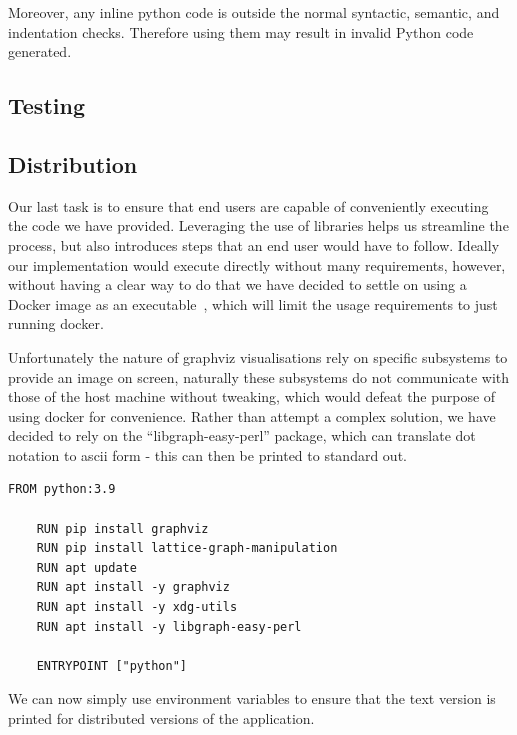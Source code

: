Moreover, any inline python code is outside the normal syntactic, semantic, and indentation checks.
Therefore using them may result in invalid Python code generated. 
\subsection{Testing}

\subsection{Distribution}
Our last task is to ensure that end users are capable of conveniently executing the code we have provided.
Leveraging the use of libraries helps us streamline the process, but also introduces steps that an end user would have
to follow.
Ideally our implementation would execute directly without many requirements, however, without having a clear way to do
that we have decided to settle on using a Docker image as an executable~\cite{DockerExec}, which will limit the usage
requirements to just running docker.

Unfortunately the nature of graphviz visualisations rely on specific subsystems to provide an image on screen, naturally
these subsystems do not communicate with those of the host machine without tweaking, which would defeat the purpose of
using docker for convenience.
Rather than attempt a complex solution, we have decided to rely on the ``libgraph-easy-perl'' package, which can
translate dot notation to ascii form - this can then be printed to standard out.

\begin{lstlisting}[caption={The DockerFile used for distribution},captionpos=b,label={lst:dockerfile}]
    FROM python:3.9

    RUN pip install graphviz
    RUN pip install lattice-graph-manipulation
    RUN apt update
    RUN apt install -y graphviz
    RUN apt install -y xdg-utils
    RUN apt install -y libgraph-easy-perl

    ENTRYPOINT ["python"]
\end{lstlisting}

We can now simply use environment variables to ensure that the text version is printed for distributed versions of
the application.
